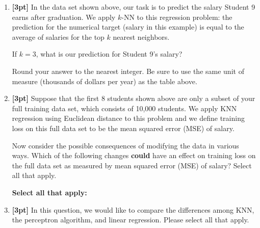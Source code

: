 \begin{enumerate}
 
    
    
    \item \textbf{[3pt]} In the data set shown above, our task is to predict the salary Student 9 earns after graduation. We apply $k$-NN to this regression problem: the prediction for the numerical target (salary in this example) is equal to the average of salaries for the top $k$ nearest neighbors. 
    
    If $k=3$, what is our prediction for Student 9's salary?
    
    Round your answer to the nearest integer. Be sure to use the same unit of measure (thousands of dollars per year) as the table above.
    
    \begin{tcolorbox}[fit,height=1cm, width=4cm, blank, borderline={1pt}{-2pt},nobeforeafter]
    \end{tcolorbox}
    
    

\newpage
    \item \textbf{[3pt]} Suppose that the first 8 students shown above are only a subset of your full training data set, which consists of 10,000 students. We apply KNN regression using Euclidean distance to this problem and we define training loss on this full data set to be the mean squared error (MSE) of salary.

    Now consider the possible consequences of modifying the data in various ways. Which of the following changes \textbf{could} have an effect on training loss on the full data set as measured by mean squared error (MSE) of salary? Select all that apply.
    
    
        
    \textbf{Select all that apply:}

    
    
    \item \textbf{[3pt]} In this question, we would like to compare the differences among KNN, the perceptron algorithm, and linear regression. Please select all that apply.
    

\end{enumerate}
